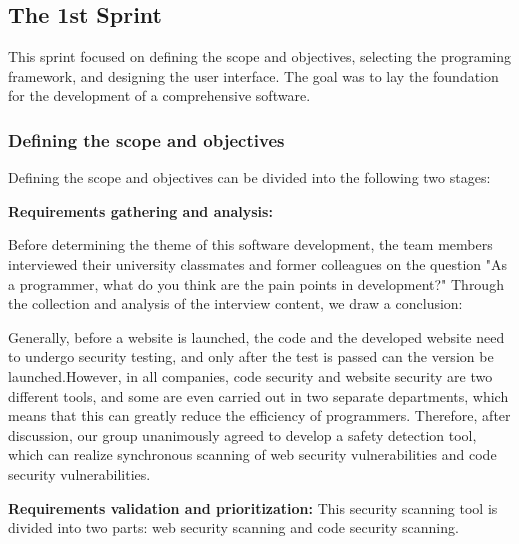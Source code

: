 \documentclass[journal]{IEEEtran}
\begin{document}
\subsection{The 1st Sprint}
\label{sec:1stsprint}
This sprint focused on defining the scope and objectives, selecting the programing framework, and designing the user interface. The goal was to lay the foundation for the development of a comprehensive software.

\subsubsection{Defining the scope and objectives}

Defining the scope and objectives can be divided into the following two stages:

\textbf{Requirements gathering and analysis:}

Before determining the theme of this software development, the team members interviewed their university classmates and former colleagues on the question "As a programmer, what do you think are the pain points in development?" Through the collection and analysis of the interview content, we draw a conclusion: 

Generally, before a website is launched, the code and the developed website need to undergo security testing, and only after the test is passed can the version be launched.However, in all companies, code security and website security are two different tools, and some are even carried out in two separate departments, which means that this can greatly reduce the efficiency of programmers. Therefore, after discussion, our group unanimously agreed to develop a safety detection tool, which can realize synchronous scanning of web security vulnerabilities and code security vulnerabilities.

\textbf{Requirements validation and prioritization:}
This security scanning tool is divided into two parts: web security scanning and code security scanning. 
\end{document}
